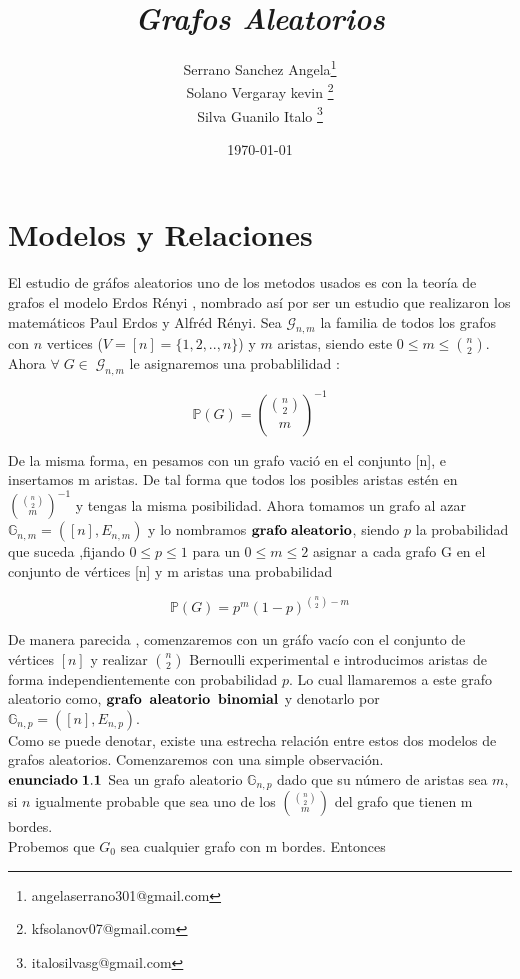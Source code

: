 \documentclass[11pt,a4paper]{article}
\title{ \Huge \sffamily \itshape {\bf Grafos Aleatorios}}
\author{Serrano Sanchez Angela\thanks{angelaserrano301@gmail.com}\\Solano Vergaray kevin \thanks{kfsolanov07@gmail.com }\\Silva Guanilo Italo \thanks{italosilvasg@gmail.com}} %
\date{\today}%
\begin{document}
\maketitle %

\section{Modelos y Relaciones}
 El estudio de gr\'afos aleatorios uno de los metodos usados  es con la teor\'ia de grafos el modelo Erdos R\'enyi , nombrado as\'i por ser un estudio que realizaron los matem\'aticos Paul Erdos y Alfr\'ed R\'enyi.
 Sea $ \mathcal{G}_{n,m}$ la familia de todos los grafos con $n$ vertices ($V = [n]=\{1,2,..,n\}$) y $m$ aristas, siendo este $0\leq m \leq\binom {n}{2}$. Ahora $\forall \;G \in \;\mathcal{G}_{n,m}$ le asignaremos una probablilidad :
 
 $$\mathbb{P}(G) =\binom {\binom {n}{2}}{m}^{-1}$$
 
De la misma forma, en pesamos con un grafo vaci\'o en el conjunto [n], e insertamos m aristas. De tal forma que todos los posibles aristas est\'en en $\binom {\binom {n}{2}}{m}^{-1}$ y tengas la misma posibilidad. Ahora tomamos un grafo al azar $\mathbb{G}_{n,m} =([n],E_{n,m})$ y lo nombramos ${\bf grafo\;aleatorio}$, siendo $p$ la probabilidad  que suceda ,fijando $0\leq p \leq 1$ para un  $0\leq m \leq 2$ 
asignar a cada grafo G en el conjunto de v\'ertices [n] y m aristas una probabilidad

$$\mathbb{P}(G) = p^m(1-p)^{\binom {n}{2}-m}$$

De manera parecida , comenzaremos con un gr\'afo vac\'io con el conjunto de v\'ertices $[n]$ y realizar
$\binom {n}{2}$ Bernoulli experimental e introducimos aristas de forma independientemente  con probabilidad $p$. Lo cual llamaremos a este grafo aleatorio como, ${\bf grafo \;\; aleatorio\;\;  binomial}$ y denotarlo por $\mathbb{G}_{n,p}=([n],E_{n,p})$.\\
Como se puede denotar, existe una estrecha relaci\'on entre estos dos modelos
de grafos aleatorios. Comenzaremos  con una simple observaci\'on.\\

${\bf enunciado \; 1.1}$ Sea un grafo aleatorio
$\mathbb{G}_{n,p}$ dado que su n\'umero de aristas sea $m$, si $n$ igualmente probable que sea uno de los $\binom {\binom {n}{2}}{m}$ del grafo que tienen m bordes.\\
Probemos que $G_0$ sea cualquier grafo con m bordes. Entonces
 
\end{document}
